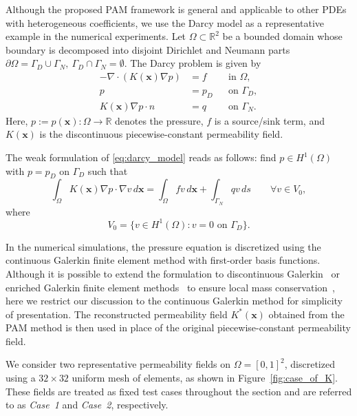 \documentclass[final,1p,times]{elsarticle}
\theoremstyle{plain}
\theoremstyle{definition}
\theoremstyle{remark}
\newcommand{\bx}{\mathbf{x}}
\begin{document}
Although the proposed PAM framework is general and applicable to other
PDEs with heterogeneous coefficients, we use the Darcy model as a
representative example in the numerical experiments. Let
$\Omega \subset \mathbb{R}^2$ be a bounded domain whose boundary is decomposed into disjoint Dirichlet and Neumann parts
$\partial\Omega = \Gamma_D \cup \Gamma_N, ~ \Gamma_D \cap \Gamma_N = \emptyset.
$ The Darcy problem is given by
\begin{subequations}\label{eq:darcy_model}
\begin{align}
-\nabla \cdot (K(\bx)\nabla p) &= f && \text{in } \Omega, \\
p &= p_D && \text{on } \Gamma_D, \\
K(\bx)\nabla p \cdot n &= q && \text{on } \Gamma_N .
\end{align}
\end{subequations}
Here, $p := p(\bx): \Omega \to \mathbb{R}$ denotes the pressure,
$f$ is a source/sink term, and $K(\bx)$ is the discontinuous
piecewise-constant permeability field.

The weak formulation of \eqref{eq:darcy_model} reads as follows:
find $p \in H^1(\Omega)$ with $p = p_D$ on $\Gamma_D$ such that
\begin{equation}
\int_{\Omega} K(\bx)\nabla p \cdot \nabla v \, d\bx
=
\int_{\Omega} f v \, d\bx
+
\int_{\Gamma_N} q v \, ds
\qquad \forall v \in V_0,
\end{equation}
where
$$
V_0 = \{ v \in H^1(\Omega) : v = 0 \text{ on } \Gamma_D \}.
$$

In the numerical simulations, the pressure equation is discretized
using the continuous Galerkin finite element method with first-order
basis functions. Although it is possible to extend the formulation to
discontinuous Galerkin~\cite{riviere2008discontinuous} or enriched Galerkin finite element methods~\cite{lee2016locally} to
ensure local mass conservation~\cite{scovazzi2017analytical,arbogast2002implementation,dawson2004compatible}, here we restrict our discussion to the
continuous Galerkin method for simplicity of presentation.
The reconstructed permeability field
$K^*(\bx)$ obtained from the PAM method is then used in place of the
original piecewise-constant permeability field.

We consider two representative permeability fields on
$\Omega=[0,1]^2$, discretized using a $32\times32$ uniform mesh of
elements, as shown in Figure~\ref{fig:case_of_K}. These fields are
treated as fixed test cases throughout the section and are referred to
as \emph{Case~1} and \emph{Case~2}, respectively.
\end{document}
